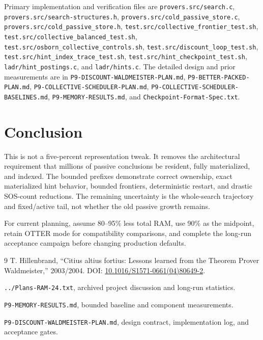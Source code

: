 \documentclass[11pt]{article}
\newcommand{\setting}[1]{\texttt{#1}}
\begin{document}
Primary implementation and verification files are
\setting{provers.src/search.c},
\setting{provers.src/search-structures.h},
\setting{provers.src/cold\_passive\_store.c},
\setting{provers.src/cold\_passive\_store.h},
\setting{test.src/collective\_frontier\_test.sh},
\setting{test.src/collective\_balanced\_test.sh},
\setting{test.src/osborn\_collective\_controls.sh},
\setting{test.src/discount\_loop\_test.sh},
\setting{test.src/hint\_index\_trace\_test.sh},
\setting{test.src/hint\_checkpoint\_test.sh},
\setting{ladr/hint\_postings.c}, and \setting{ladr/hints.c}.  The detailed
design and prior measurements are in
\setting{P9-DISCOUNT-WALDMEISTER-PLAN.md},
\setting{P9-BETTER-PACKED-PLAN.md},
\setting{P9-COLLECTIVE-SCHEDULER-PLAN.md},
\setting{P9-COLLECTIVE-SCHEDULER-BASELINES.md},
\setting{P9-MEMORY-RESULTS.md}, and
\setting{Checkpoint-Format-Spec.txt}.

\section{Conclusion}

This is not a five-percent representation tweak.  It removes the architectural
requirement that millions of passive conclusions be resident, fully
materialized, and indexed.  The bounded prefixes demonstrate correct
ownership, exact materialized hint behavior, bounded frontiers, deterministic
restart, and drastic SOS-count reductions.  The remaining uncertainty is the
whole-search trajectory and fixed/active tail, not whether the old passive
growth remains.

For current planning, assume 80--95\% less total RAM, use 90\% as the midpoint,
retain OTTER mode for compatibility comparisons, and complete the long-run
acceptance campaign before changing production defaults.

\begin{thebibliography}{9}
T. Hillenbrand,
``Citius altius fortius: Lessons learned from the Theorem Prover Waldmeister,''
2003/2004. DOI: \href{https://doi.org/10.1016/S1571-0661(04)80649-2}
{10.1016/S1571-0661(04)80649-2}.

\setting{../Plans-RAM-24.txt}, archived project discussion and long-run
statistics.

\setting{P9-MEMORY-RESULTS.md}, bounded baseline and component measurements.

\setting{P9-DISCOUNT-WALDMEISTER-PLAN.md}, design contract, implementation
log, and acceptance gates.
\end{thebibliography}
\end{document}
